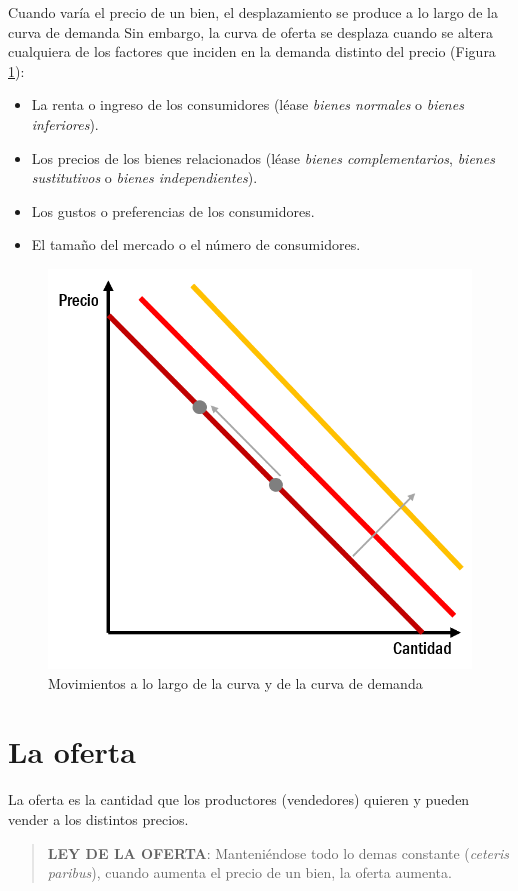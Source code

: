 \documentclass[
]{krantz}
\providecommand{\tightlist}{%
  \setlength{\itemsep}{0pt}\setlength{\parskip}{0pt}}
\begin{document}
Cuando varía el precio de un bien, el desplazamiento se produce a lo largo de la curva de demanda Sin embargo, la curva de oferta se desplaza cuando se altera cualquiera de los factores que inciden en la demanda distinto del precio (Figura \ref{fig:12a-02}):

\begin{itemize}
\tightlist
\item
  La renta o ingreso de los consumidores (léase \emph{bienes normales} o \emph{bienes inferiores}).
\item
  Los precios de los bienes relacionados (léase \emph{bienes complementarios}, \emph{bienes sustitutivos} o \emph{bienes independientes}).
\item
  Los gustos o preferencias de los consumidores.
\item
  El tamaño del mercado o el número de consumidores.
\end{itemize}

\begin{figure}

{\centering \includegraphics[width=0.5\linewidth]{images/12a-02} 

}

\caption{Movimientos a lo largo de la curva y de la curva de demanda}\label{fig:12a-02}
\end{figure}

\hypertarget{la-oferta}{%
\section{La oferta}\label{la-oferta}}

La oferta es la cantidad que los productores (vendedores) quieren y pueden vender a los distintos precios.

\begin{quote}
\textbf{LEY DE LA OFERTA}:
Manteniéndose todo lo demas constante (\emph{ceteris paribus}), cuando aumenta el precio de un bien, la oferta aumenta.
\end{quote}
\end{document}
